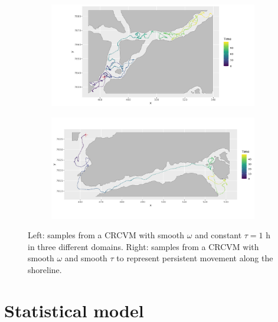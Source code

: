 \documentclass[11pt]{article}
\newcommand {\1}{\mathbb{1}}
\begin{document}
\begin{figure}[H]
 	\begin{subfigure}{0.48\textwidth}
 		\centering
 		\includegraphics[scale=0.3]{images/crcvm/illustrative_sample_fjords_standard}
 		\label{fig:illustrativesamplefjordsstandard}
 	\end{subfigure}	
 	\begin{subfigure}{0.48\textwidth}
 		\centering
 		\includegraphics[scale=0.3]{images/crcvm/illustrative_sample_fjords_pers}
 		\label{fig:illustrativesamplefjordspers}
 	\end{subfigure}
 	\caption{Left: samples from a CRCVM with smooth $\omega$ and constant $\tau=1$ h in three different domains. Right: samples from a CRCVM with smooth $\omega$ and smooth $\tau$ to represent persistent movement along the shoreline.}
 	\label{fig: crcvm examples}
 \end{figure}







\section{Statistical model}
\end{document}
